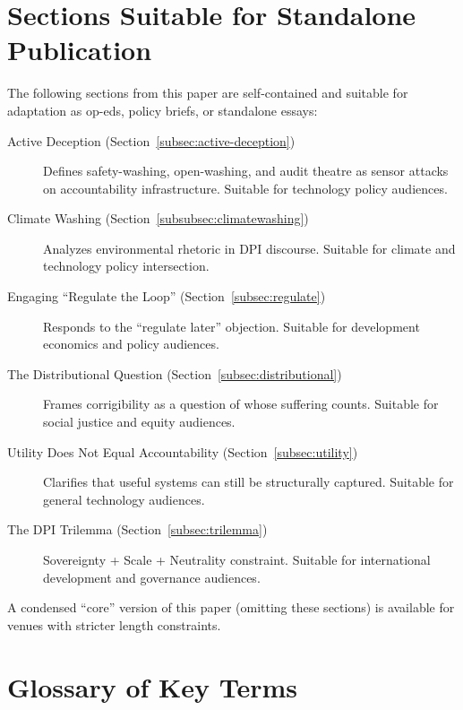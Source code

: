 \documentclass{article}
\begin{document}
\section{Sections Suitable for Standalone Publication}
\label{appendix:opeds}

The following sections from this paper are self-contained and suitable for adaptation as op-eds, policy briefs, or standalone essays:

\begin{description}
\item[Active Deception (Section~\ref{subsec:active-deception})] Defines safety-washing, open-washing, and audit theatre as sensor attacks on accountability infrastructure. Suitable for technology policy audiences.

\item[Climate Washing (Section~\ref{subsubsec:climatewashing})] Analyzes environmental rhetoric in DPI discourse. Suitable for climate and technology policy intersection.

\item[Engaging ``Regulate the Loop'' (Section~\ref{subsec:regulate})] Responds to the ``regulate later'' objection. Suitable for development economics and policy audiences.

\item[The Distributional Question (Section~\ref{subsec:distributional})] Frames corrigibility as a question of whose suffering counts. Suitable for social justice and equity audiences.

\item[Utility Does Not Equal Accountability (Section~\ref{subsec:utility})] Clarifies that useful systems can still be structurally captured. Suitable for general technology audiences.

\item[The DPI Trilemma (Section~\ref{subsec:trilemma})] Sovereignty + Scale + Neutrality constraint. Suitable for international development and governance audiences.
\end{description}

A condensed ``core'' version of this paper (omitting these sections) is available for venues with stricter length constraints.

\section{Glossary of Key Terms}
\label{appendix:glossary}
\end{document}
